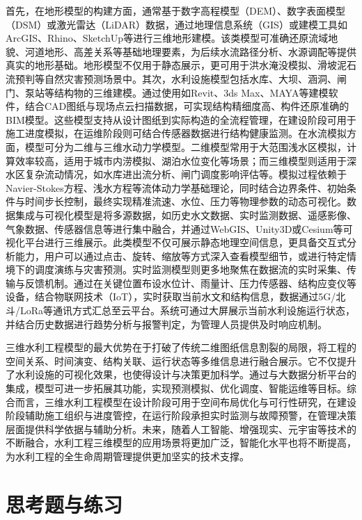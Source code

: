 首先，在地形模型的构建方面，通常基于数字高程模型（DEM）、数字表面模型（DSM）或激光雷达（LiDAR）数据，通过地理信息系统（GIS）或建模工具如ArcGIS、Rhino、SketchUp等进行三维地形建模。该类模型可准确还原流域地貌、河道地形、高差关系等基础地理要素，为后续水流路径分析、水源调配等提供真实的地形基础。地形模型不仅用于静态展示，更可用于洪水淹没模拟、滑坡泥石流预判等自然灾害预测场景中。其次，水利设施模型包括水库、大坝、涵洞、闸门、泵站等结构物的三维建模。通过使用如Revit、3ds Max、MAYA等建模软件，结合CAD图纸与现场点云扫描数据，可实现结构精细度高、构件还原准确的BIM模型。这些模型支持从设计图纸到实际构造的全流程管理，在建设阶段可用于施工进度模拟，在运维阶段则可结合传感器数据进行结构健康监测。在水流模拟方面，模型可分为二维与三维水动力学模型。二维模型常用于大范围浅水区模拟，计算效率较高，适用于城市内涝模拟、湖泊水位变化等场景；而三维模型则适用于深水区复杂流动情况，如水库进出流分析、闸门调度影响评估等。模拟过程依赖于Navier-Stokes方程、浅水方程等流体动力学基础理论，同时结合边界条件、初始条件与时间步长控制，最终实现精准流速、水位、压力等物理参数的动态可视化。数据集成与可视化模型是将多源数据，如历史水文数据、实时监测数据、遥感影像、气象数据、传感器信息等进行集中融合，并通过WebGIS、Unity3D或Cesium等可视化平台进行三维展示。此类模型不仅可展示静态地理空间信息，更具备交互式分析能力，用户可以通过点击、旋转、缩放等方式深入查看模型细节，或进行特定情境下的调度演练与灾害预测。实时监测模型则更多地聚焦在数据流的实时采集、传输与反馈机制。通过在关键位置布设水位计、雨量计、压力传感器、结构应变仪等设备，结合物联网技术（IoT），实时获取当前水文和结构信息，数据通过5G/北斗/LoRa等通讯方式汇总至云平台。系统可通过大屏展示当前水利设施运行状态，并结合历史数据进行趋势分析与报警判定，为管理人员提供及时响应机制。

三维水利工程模型的最大优势在于打破了传统二维图纸信息割裂的局限，将工程的空间关系、时间演变、结构关联、运行状态等多维信息进行融合展示。它不仅提升了水利设施的可视化效果，也使得设计与决策更加科学。通过与大数据分析平台的集成，模型可进一步拓展其功能，实现预测模拟、优化调度、智能运维等目标。综合而言，三维水利工程模型在设计阶段可用于空间布局优化与可行性研究，在建设阶段辅助施工组织与进度管控，在运行阶段承担实时监测与故障预警，在管理决策层面提供科学依据与辅助分析。未来，随着人工智能、增强现实、元宇宙等技术的不断融合，水利工程三维模型的应用场景将更加广泛，智能化水平也将不断提高，为水利工程的全生命周期管理提供更加坚实的技术支撑。

\section{思考题与练习}

